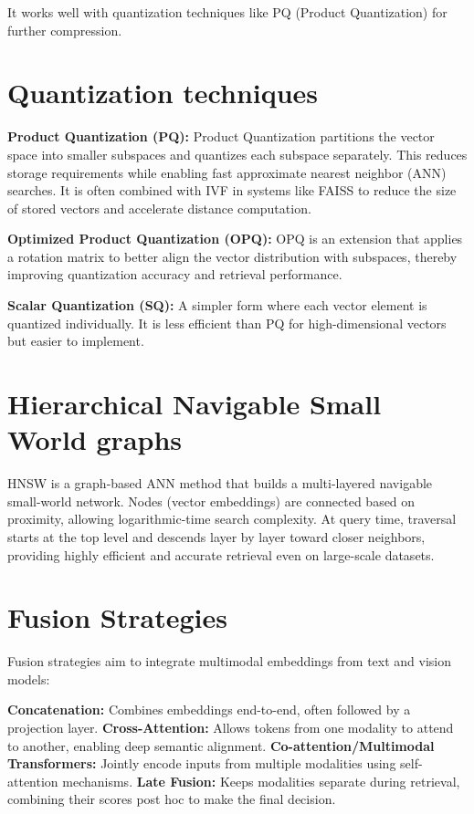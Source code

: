 \documentclass[12pt,twoside]{report}
\begin{document}
It works well with quantization techniques like PQ (Product Quantization) for further compression.

\section{Quantization techniques}
\label{appendix:quantizationTechniques}
\textbf{Product Quantization (PQ):}
Product Quantization partitions the vector space into smaller subspaces and quantizes each subspace separately. This reduces storage requirements while enabling fast approximate nearest neighbor (ANN) searches. It is often combined with IVF in systems like FAISS to reduce the size of stored vectors and accelerate distance computation.

\textbf{Optimized Product Quantization (OPQ):}
OPQ is an extension that applies a rotation matrix to better align the vector distribution with subspaces, thereby improving quantization accuracy and retrieval performance.

\textbf{Scalar Quantization (SQ):}
A simpler form where each vector element is quantized individually. It is less efficient than PQ for high-dimensional vectors but easier to implement.

\section{Hierarchical Navigable Small World graphs}
\label{appendix:HNSW}
HNSW is a graph-based ANN method that builds a multi-layered navigable small-world network. Nodes (vector embeddings) are connected based on proximity, allowing logarithmic-time search complexity. At query time, traversal starts at the top level and descends layer by layer toward closer neighbors, providing highly efficient and accurate retrieval even on large-scale datasets.

\section{Fusion Strategies}
\label{appendix:fusionStrategies}
Fusion strategies aim to integrate multimodal embeddings from text and vision models:

\textbf{Concatenation:} Combines embeddings end-to-end, often followed by a projection layer.
\textbf{Cross-Attention:} Allows tokens from one modality to attend to another, enabling deep semantic alignment.
\textbf{Co-attention/Multimodal Transformers:} Jointly encode inputs from multiple modalities using self-attention mechanisms.
\textbf{Late Fusion:} Keeps modalities separate during retrieval, combining their scores post hoc to make the final decision.
\end{document}
